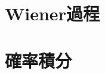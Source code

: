 \documentclass[a4j,10.5pt,oneside,openany]{jsbook}
\theoremstyle{mystyle}
\begin{document}
	\section{Wiener過程}
		
		
		
	\section{確率積分}
		
		
		
		
		
		
		

%	

\newpage
\printindex


%
%
\end{document}
